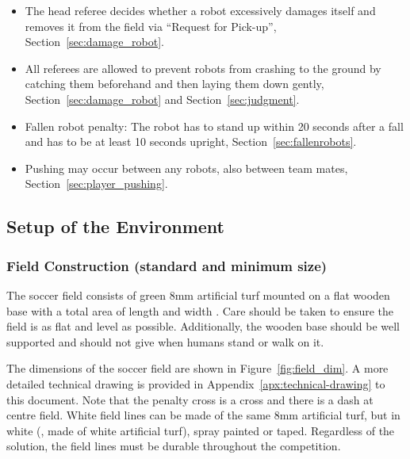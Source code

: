 \begin{itemize}
\item The head referee decides whether a robot excessively damages itself and removes it from the field via ``Request for Pick-up'', \cf Section~\ref{sec:damage_robot}.
\item All referees are allowed to prevent robots from crashing to the ground by catching them beforehand and then laying them down gently, \cf Section~\ref{sec:damage_robot} and Section~\ref{sec:judgment}.
\item Fallen robot penalty: The robot has to stand up within 20 seconds after a fall and has to be at least 10 seconds upright, \cf Section~\ref{sec:fallenrobots}.
\item Pushing may occur between any robots, \ie also between team mates, \cf Section~\ref{sec:player_pushing}.
\end{itemize}

\subsection{Setup of the Environment}
\label{sec:environment_setup}
\subsubsection{Field Construction (standard and minimum size)}
\label{sec:field_dim}

The  soccer field consists of green 8mm artificial turf mounted on a flat wooden base with  a total area of length \TotalLength and width \TotalWidth.  Care should be taken to ensure the field is as flat and level as possible.  Additionally, the wooden base should be well supported and should not give when humans stand or walk on it.


The  dimensions of the soccer field are shown in Figure~\ref{fig:field_dim}. A more detailed technical drawing is provided in Appendix~\ref{apx:technical-drawing} to this document.
Note that the penalty cross is a cross and there is a dash at centre field. White field lines can be made of the same 8mm artificial turf, but in white (\ie, made of white artificial turf), spray painted or taped. Regardless of the solution, the field lines must be durable throughout the competition.

